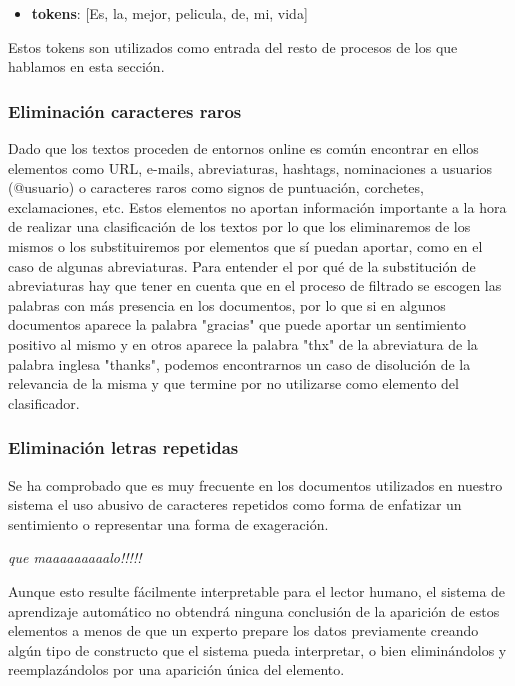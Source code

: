 \begin{itemize}
	\item \textbf{tokens}: [Es, la, mejor, pelicula, de, mi, vida]
\end{itemize}

Estos tokens son utilizados como entrada del resto de procesos de los que hablamos en esta sección.

\subsubsection{Eliminación caracteres raros}

Dado que los textos proceden de entornos online es común encontrar en ellos elementos como URL, e-mails, abreviaturas, hashtags, nominaciones a usuarios (@usuario) o caracteres raros como signos de puntuación, corchetes, exclamaciones, etc. Estos elementos no aportan información importante a la hora de realizar una clasificación de los textos por lo que los eliminaremos de los mismos o los substituiremos por elementos que sí puedan aportar, como en el caso de algunas abreviaturas. Para entender el por qué de la substitución de abreviaturas hay que tener en cuenta que en el proceso de filtrado se escogen las palabras con más presencia en los documentos, por lo que si en algunos documentos aparece la palabra "gracias" que puede aportar un sentimiento positivo al mismo y en otros aparece la palabra "thx" de la abreviatura de la palabra inglesa "thanks", podemos encontrarnos un caso de disolución de la relevancia de la misma y que termine por no utilizarse como elemento del clasificador. 

\subsubsection{Eliminación letras repetidas}

Se ha comprobado que es muy frecuente en los documentos utilizados en nuestro sistema el uso abusivo de caracteres repetidos como forma de enfatizar un sentimiento o representar una forma de exageración.

\textit{ que maaaaaaaaalo!!!!! } 

Aunque esto resulte fácilmente interpretable para el lector humano, el sistema de aprendizaje automático no obtendrá ninguna conclusión de la aparición de estos elementos a menos de que un experto prepare los datos previamente creando algún tipo de constructo que el sistema pueda interpretar, o bien eliminándolos y reemplazándolos por una aparición única del elemento.

